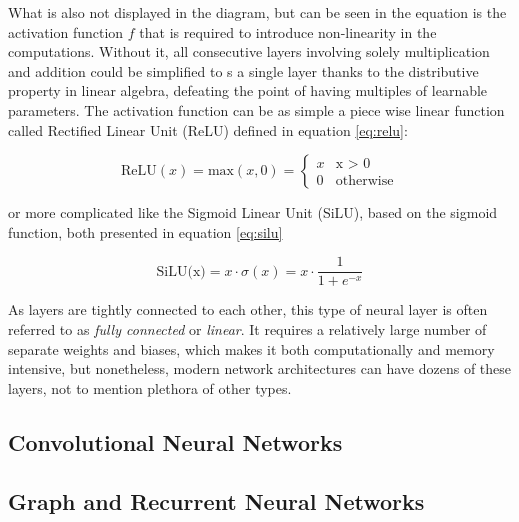 What is also not displayed in the diagram, but can be seen in the equation is the activation function \(f\) that is required to introduce non-linearity in the computations. Without it, all consecutive layers involving solely multiplication and addition could be simplified to s a single layer thanks to the distributive property in linear algebra, defeating the point of having multiples of learnable parameters. The activation function can be as simple a piece wise linear function called Rectified Linear Unit (ReLU) defined in equation \ref{eq:relu}:

\begin{equation}\label{eq:relu}
  \text{ReLU}(x) = \text{max}(x, 0) = 
  \begin{cases}
    x & \text{x > 0} \\
    0 & \text{otherwise}
  \end{cases}
\end{equation}

or more complicated like the Sigmoid Linear Unit (SiLU), based on the sigmoid function, both presented in equation \ref{eq:silu}

\begin{equation}\label{eq:silu}
  \text{SiLU(x)} = x \cdot \sigma (x) = x \cdot \frac{1}{1 + e^{-x}}
\end{equation}

As layers are tightly connected to each other, this type of neural layer is often referred to as \textit{fully connected} or \textit{linear}. It requires a relatively large number of separate weights and biases, which makes it both computationally and memory intensive, but nonetheless, modern network architectures can have dozens of these layers, not to mention plethora of other types.


\subsection{Convolutional Neural Networks}
\indo{|}
\indo{|}
\indo{|}
\indo{|}
\indo{|}


\subsection{Graph and Recurrent Neural Networks}
\indo{|}
\indo{|}
\indo{|}
\indo{|}
\indo{|}
\indo{|}
\indo{|}
\indo{|}
\indo{|}
\indo{|}

